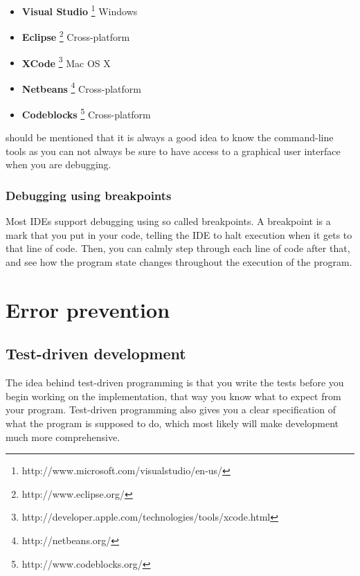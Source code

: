 \documentclass[11pt,a4paper,twoside]{article}
\begin{document}
\begin{itemize}
\item \textbf{Visual Studio} \footnote{http://www.microsoft.com/visualstudio/en-us/} Windows
\item \textbf{Eclipse} \footnote{http://www.eclipse.org/} Cross-platform
\item \textbf{XCode} \footnote{http://developer.apple.com/technologies/tools/xcode.html} Mac OS X
\item \textbf{Netbeans} \footnote{http://netbeans.org/} Cross-platform
\item \textbf{Codeblocks} \footnote{http://www.codeblocks.org/} Cross-platform
\end{itemize}


 should be mentioned that it is always a good idea to know the
command-line tools as you can not always be sure to have access to a graphical
user interface when you are debugging.  

\subsubsection{Debugging using breakpoints}

Most IDEs support debugging using so called breakpoints. A breakpoint is a mark
that you put in your code, telling the IDE to halt execution when it gets to
that line of code. Then, you can calmly step through each line of code after
that, and see how the program state changes throughout the execution of the
program.


\section{Error prevention}

\subsection{Test-driven development}

The idea behind test-driven programming is that you write the tests before you
begin working on the implementation, that way you know what to expect from your
program. Test-driven programming also gives you a clear specification of what
the program is supposed to do, which most likely will make development much
more comprehensive.
\end{document}

